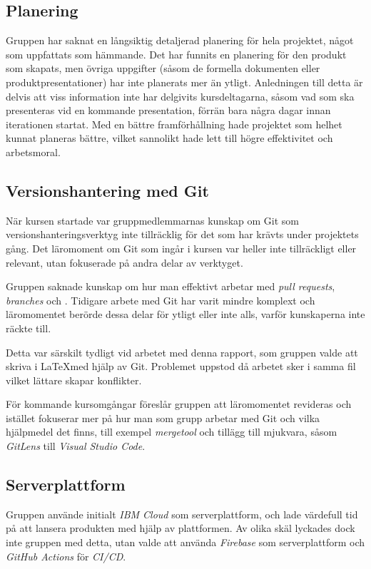 \documentclass[conference]{IEEEtran}
\begin{document}
\subsection{Planering}\label{analys:plan}
Gruppen har saknat en långsiktig detaljerad planering för hela projektet, något som uppfattats som hämmande. Det har
funnits en planering för den produkt som skapats, men övriga uppgifter (såsom de formella dokumenten eller produktpresentationer)
har inte planerats mer än ytligt. Anledningen till detta är delvis att viss information inte har delgivits kursdeltagarna,
såsom vad som ska presenteras vid en kommande presentation, förrän bara några dagar innan iterationen startat. Med en
bättre framförhållning hade projektet som helhet kunnat planeras bättre, vilket sannolikt hade lett till högre effektivitet
och arbetsmoral.

\subsection{Versionshantering med Git}\label{analys:git}
När kursen startade var gruppmedlemmarnas kunskap om Git som versionshanteringsverktyg inte tillräcklig för det som har
krävts under projektets gång. Det läromoment om Git som ingår i kursen var heller inte tillräckligt eller relevant, 
utan fokuserade på andra delar av verktyget.

Gruppen saknade kunskap om hur man effektivt arbetar med \textit{pull requests}, \textit{branches} och .
Tidigare arbete med Git har varit mindre komplext och läromomentet berörde dessa delar för ytligt eller inte alls,
varför kunskaperna inte räckte till.

Detta var särskilt tydligt vid arbetet med denna rapport, som gruppen valde att skriva i \LaTeX\:med hjälp av Git. Problemet uppstod då arbetet sker i samma fil vilket lättare skapar konflikter.

För kommande kursomgångar föreslår gruppen att läromomentet revideras och istället fokuserar mer på hur man som grupp arbetar med Git och vilka hjälpmedel det finns, till exempel \textit{mergetool} och tillägg till mjukvara, såsom \textit{GitLens} till \textit{Visual Studio Code}.

\subsection{Serverplattform}\label{analys:server}
Gruppen använde initialt \textit{IBM Cloud} som serverplattform, och lade värdefull tid på att lansera produkten med hjälp av plattformen. Av olika skäl lyckades dock inte gruppen med detta, utan valde att använda \textit{Firebase} som serverplattform och \textit{GitHub Actions} för \textit{CI/CD}.
\end{document}
